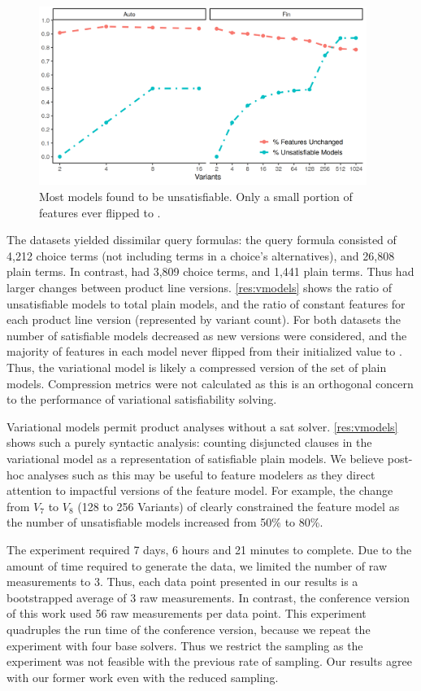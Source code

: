 ~\label{section:case-studies:results-and-discussion}
%
\begin{figure}
  \includegraphics[width=0.95\textwidth]{Plots/VModel}
  \caption{Most models found to be unsatisfiable. Only a small portion of
    features ever flipped to \tru.}%
  \label{res:vmodels}
\end{figure}
%
The datasets yielded dissimilar query formulas: the \auto{} query formula
consisted of 4,212 choice terms (not including terms in a choice's
alternatives), and 26,808 plain terms. In contrast, \fin{} had 3,809 choice
terms, and 1,441 plain terms. Thus \fin{} had larger changes between product
line versions. \autoref{res:vmodels} shows the ratio of unsatisfiable models to
total plain models, and the ratio of constant features for each product line
version (represented by variant count). For both datasets the number of
satisfiable models decreased as new versions were considered, and the majority
of features in each model never flipped from their initialized value \fls{} to
\tru{}. Thus, the variational model is likely a compressed version of the set
of plain models. Compression metrics were not calculated as this is an
orthogonal concern to the performance of variational satisfiability solving.

Variational models permit product analyses without a \ac{sat} solver.
\autoref{res:vmodels} shows such a purely syntactic analysis: counting
disjuncted clauses in the variational model as a representation of satisfiable
plain models. We believe post-hoc analyses such as this may be useful to feature
modelers as they direct attention to impactful versions of the feature model.
For example, the change from $V_{7}$ to $V_{8}$ (128 to 256 Variants) of \fin{}
clearly constrained the feature model as the number of unsatisfiable models
increased from 50\% to 80\%.

The experiment required 7 days, 6 hours and 21 minutes to complete. Due to the
amount of time required to generate the data, we limited the number of raw
measurements to 3. Thus, each data point presented in our results is a
bootstrapped average of 3 raw measurements. In contrast, the conference version
of this work used 56 raw measurements per data point. This experiment quadruples
the run time of the conference version, because we repeat the experiment with
four base solvers. Thus we restrict the sampling as the experiment was not
feasible with the previous rate of sampling. Our results agree with our former
work even with the reduced sampling.


